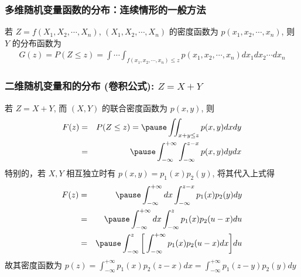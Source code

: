  \begin{frame}
 	\frametitle{多维随机变量函数的分布：连续情形的一般方法}
 	若 $Z=f (X_1,X_2,\cdots,X_n)$, $(X_1,X_2,\cdots,X_n)$ 的密度函数为 $p (x_1,x_2,\cdots,x_n)$, 则 $Y$ 的分布函数为
 	\begin{eqnarray*}
 		G(z)=P(Z\le z)=\int\cdots\int_{f(x_1,x_2,\cdots,x_n)\le z}p(x_1,x_2,\cdots,x_n)dx_1dx_2\cdots dx_n
 	\end{eqnarray*}

 \end{frame}
 \begin{frame}
 	\frametitle{二维随机变量和的分布 (卷积公式): $Z=X+Y$}
 	\begin{thm}
 		若 $Z=X+Y$, 而 $(X,Y)$ 的联合密度函数为 $p (x,y)$, 则
 		\begin{eqnarray*}
 			F(z)&=&P(Z\le z)=\pause \iint_{x+y\le z}p(x,y)dxdy\\
 			&=&\pause \int_{-\infty}^{+\infty}\int_{-\infty}^{z-x}p(x,y)dydx
 		\end{eqnarray*}
 		\pause 特别的，若 $X,Y$ 相互独立时有 $p (x,y)=p_1 (x) p_2 (y)$, 将其代入上式得 %
 		\pause \begin{eqnarray*}
 			F(z)&=&\pause \int_{-\infty}^{+\infty}dx\int_{-\infty}^{z-x}p_1(x)p_2(y)dy\\
 			&=& \pause  \int_{-\infty}^{+\infty}dx\int_{-\infty}^zp_1(x)p_2(u-x)du\\
 			&=& \pause  \int_{-\infty}^{z}\bigg[\int_{-\infty}^{+\infty}p_1(x)p_2(u-x)dx\bigg]du\\
 		\end{eqnarray*}
 		\pause 故其密度函数为 $p (z)=\int_{-\infty}^{+\infty} p_1 (x) p_2 (z-x) dx=\int_{-\infty}^{+\infty} p_1 (z-y) p_2 (y) dy$
 	\end{thm}
 \end{frame}
